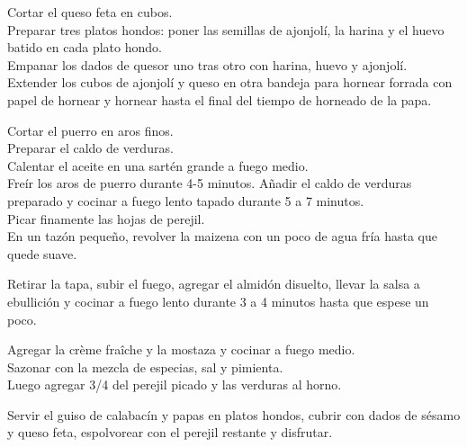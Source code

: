 \begin{recipe}
{        \step Cortar el queso feta en cubos.\\
        Preparar tres platos hondos: poner las semillas de ajonjol\'i, la harina y el huevo batido en cada plato hondo.\\
        Empanar los dados de quesor uno tras otro con harina, huevo y ajonjol\'i.\\
        Extender los cubos de ajonjol\'i y queso en otra bandeja para hornear forrada con papel de hornear y hornear hasta el final del tiempo de horneado de la papa.
        
        \step Cortar el puerro en aros finos.\\
        Preparar el caldo de verduras.\\
        Calentar el aceite en una sart\'en grande a fuego medio.\\
        Fre\'ir los aros de puerro durante 4-5 minutos.
        A\~nadir el caldo de verduras preparado y cocinar a fuego lento tapado durante 5 a 7 minutos.\\
        Picar finamente las hojas de perejil.\\
        En un taz\'on peque\~no, revolver la maizena con un poco de agua fr\'ia hasta que quede suave.
        
        \step Retirar la tapa, subir el fuego, agregar el almid\'on disuelto, llevar la salsa a ebullici\'on y cocinar a fuego lento durante 3 a 4 minutos hasta que espese un poco.
        
        \step Agregar la cr\`eme fra\^iche y la mostaza y cocinar a fuego medio.\\
        Sazonar con la mezcla de especias, sal y pimienta.\\
        Luego agregar 3/4 del perejil picado y las verduras al horno.
        
        \step Servir el guiso de calabac\'in y papas en platos hondos, cubrir con dados de s\'esamo y queso feta, espolvorear con el perejil restante y disfrutar.
    }
    
    
    

    
\end{recipe}